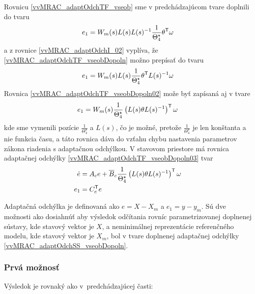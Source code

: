 \documentclass[a4paper, 10pt, ]{article}
\begin{document}
Rovnicu \eqref{vvMRAC_adaptOdchTF_vseob} sme v predchádzajúcom tvare doplnili do tvaru
\begin{equation} \label{vvMRAC_adaptOdchTF_vseobDopoln}
	e_1 = W_m(s) L(s) L(s)^{-1} \frac{1}{\Theta_4^\star} \theta^{\mathsf{T}} \omega
\end{equation}
a z rovnice \eqref{vvMRAC_adaptOdchI_02} vyplíva, že \eqref{vvMRAC_adaptOdchTF_vseobDopoln} možno prepísať do tvaru
\begin{equation} \label{vvMRAC_adaptOdchTF_vseobDopoln02}
	e_1 = W_m(s) L(s) \frac{1}{\Theta_4^\star} \theta^{\mathsf{T}} L(s)^{-1}  \omega
\end{equation}
Rovnica \eqref{vvMRAC_adaptOdchTF_vseobDopoln02} može byť zapísaná aj v tvare
\begin{equation} \label{vvMRAC_adaptOdchTF_vseobDopoln03}
	e_1  = W_m(s) \frac{1}{\Theta_4^\star} \left( L(s) \theta L(s)^{-1} \right)^{\mathsf{T}} \omega
\end{equation}
kde sme vymenili pozície $\frac{1}{\Theta_4^\star}$ a $L(s)$, čo je možné, pretože $\frac{1}{\Theta_4^\star}$ je len konštanta a nie funkcia času, a táto rovnica dáva do vzťahu chybu nastavenia parametrov zákona riadenia s adaptačnou odchýlkou. V stavovom priestore má rovnica  adaptačnej odchýlky \eqref{vvMRAC_adaptOdchTF_vseobDopoln03} tvar
\begin{subequations} \label{vvMRAC_adaptOdchSS_vseobDopoln}
	\begin{align}
		\dot{e} &= A_c e + \overline{B}_c \frac{1}{\Theta_4^\star} \left( L(s) \theta L(s)^{-1} \right)^{\mathsf{T}} \omega \\
		e_1 &= C_c^{\mathsf{T}} e
	\end{align}
\end{subequations}

Adaptačná odchýlka je definovaná ako $e = X - X_m$ a $e_1 = y - y_m$. Sú dve možnosti ako dosiahnúť aby výsledok odčítania rovníc parametrizovanej doplnenej sústavy, kde stavový vektor je $X$, a neminimálnej reprezentácie referenčného modelu, kde stavový vektor je $X_m$, bol v tvare doplnenej adaptačnej odchýlky \eqref{vvMRAC_adaptOdchSS_vseobDopoln}.





\subsubsection{Prvá možnosť}

Výsledok je rovnaký ako v~predchádzajúcej časti:
\end{document}
